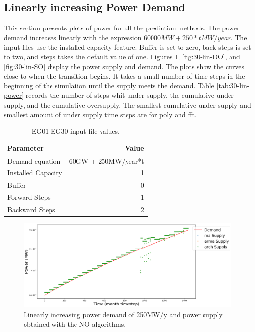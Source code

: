 \documentclass[11pt]{article}
\begin{document}
\subsection{Linearly increasing Power Demand}

This section presents plots of power for all the prediction methods. The power demand increases linearly with the expression $60000 MW + 250*t MW/year$. The input files use the installed capacity feature. Buffer is set to zero, back steps is set to two, and steps takes the default value of one.
Figures \ref{fig:30-lin-NO}, \ref{fig:30-lin-DO}, and \ref{fig:30-lin-SO} display the power supply and demand. The plots show the curves close to when the transition begins. It takes a small number of time steps in the beginning of the simulation until the supply meets the demand.
Table \ref{tab:30-lin-power} records the number of steps whit under supply, the cumulative under supply, and the cumulative oversupply. The smallest cumulative under supply and smallest amount of under supply time steps are for poly and fft.

\begin{table}[H]
	\centering
	\caption{EG01-EG30 input file values.}
	\label{tab:30-inputs}
	\begin{tabularx}{\textwidth}{lR}
		\hline
		Parameter			& Value \\ 	\hline
		Demand equation		& 60GW + 250MW/year*t  \\
		Installed Capacity 	& 1 \\
		Buffer    			& 0 \\
		Forward Steps		& 1 \\
		Backward Steps		& 2 \\		\hline
	\end{tabularx}
\end{table}

\begin{figure}[H]
	\centering
	\includegraphics[width=\textwidth]{30-figures/lin-30-power-buffer01.png} 
	\hfill
	\caption{Linearly increasing power demand of 250MW/y and power supply obtained with the NO algorithms.}
	\label{fig:30-lin-NO}
\end{figure}
\end{document}
